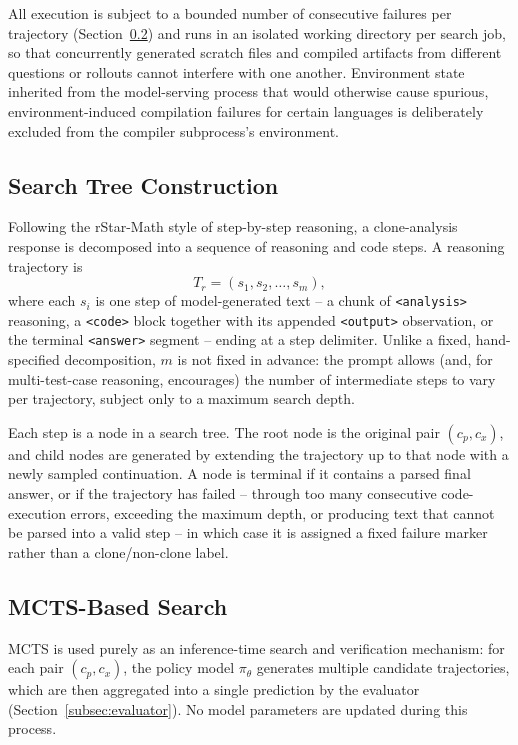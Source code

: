 All execution is subject to a bounded number of consecutive failures per
trajectory (Section~\ref{subsec:mcts_search}) and runs in an isolated working
directory per search job, so that concurrently generated scratch files and
compiled artifacts from different questions or rollouts cannot interfere with
one another. Environment state inherited from the model-serving process that
would otherwise cause spurious, environment-induced compilation failures for
certain languages is deliberately excluded from the compiler subprocess's
environment.

\subsection{Search Tree Construction}
\label{subsec:search_space}

Following the rStar-Math style of step-by-step reasoning, a clone-analysis
response is decomposed into a sequence of reasoning and code steps. A
reasoning trajectory is
\[
    T_r = (s_1, s_2, \ldots, s_m),
\]
where each $s_i$ is one step of model-generated text -- a chunk of
\texttt{<analysis>} reasoning, a \texttt{<code>} block together with its
appended \texttt{<output>} observation, or the terminal \texttt{<answer>}
segment -- ending at a step delimiter. Unlike a fixed, hand-specified
decomposition, $m$ is not fixed in advance: the prompt allows (and, for
multi-test-case reasoning, encourages) the number of intermediate steps to
vary per trajectory, subject only to a maximum search depth.

Each step is a node in a search tree. The root node is the original pair
$(c_p,c_x)$, and child nodes are generated by extending the trajectory up to
that node with a newly sampled continuation. A node is terminal if it
contains a parsed final answer, or if the trajectory has failed -- through
too many consecutive code-execution errors, exceeding the maximum depth, or
producing text that cannot be parsed into a valid step -- in which case it is
assigned a fixed failure marker rather than a clone/non-clone label.

\subsection{MCTS-Based Search}
\label{subsec:mcts_search}

MCTS is used purely as an inference-time search and verification mechanism:
for each pair $(c_p,c_x)$, the policy model $\pi_\theta$ generates multiple
candidate trajectories, which are then aggregated into a single prediction by
the evaluator (Section~\ref{subsec:evaluator}). No model parameters are
updated during this process.

